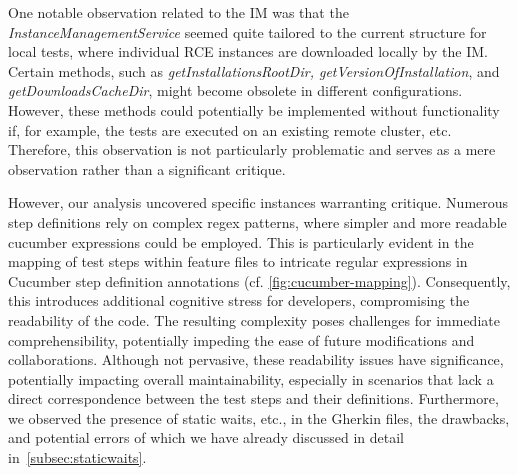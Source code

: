 One notable observation related to the \ac{IM} was that the \textit{InstanceManagementService} seemed quite tailored to the current structure for local tests, where individual \ac{RCE} instances are downloaded locally by the \ac{IM}. Certain methods, such as \textit{getInstallationsRootDir, getVersionOfInstallation}, and \textit{getDownloadsCacheDir}, might become obsolete in different configurations. However, these methods could potentially be implemented without functionality if, for example, the tests are executed on an existing remote cluster, etc. Therefore, this observation is not particularly problematic and serves as a mere observation rather than a significant critique.

However, our analysis uncovered specific instances warranting critique. Numerous step definitions rely on complex regex patterns, where simpler and more readable cucumber expressions could be employed. This is particularly evident in the mapping of test steps within feature files to intricate regular expressions in Cucumber step definition annotations (cf. \cref{fig:cucumber-mapping}). Consequently, this introduces additional cognitive stress for developers, compromising the readability of the code. The resulting complexity poses challenges for immediate comprehensibility, potentially impeding the ease of future modifications and collaborations. Although not pervasive, these readability issues have significance, potentially impacting overall maintainability, especially in scenarios that lack a direct correspondence between the test steps and their definitions. Furthermore, we observed the presence of static waits, etc., in the Gherkin files, the drawbacks, and potential errors of which we have already discussed in detail in~\cref{subsec:staticwaits}.